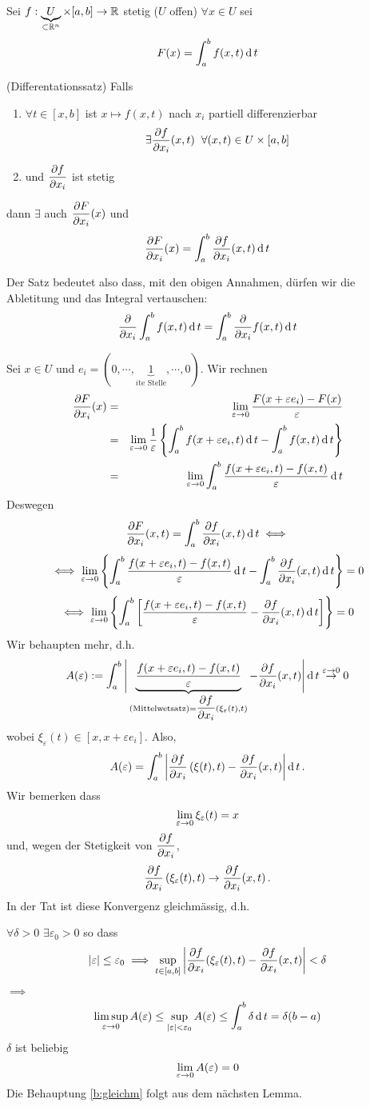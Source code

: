Sei $f:\underbrace{U}_{\subset \mathbb{R}^n}\times [a,b]\rightarrow\mathbb{R}$ stetig ($U$ offen) $\forall x\in U$ sei
\[F(x)=\int_a^bf(x,t)\operatorname{d} t\]
\begin{Sat}
  (Differentationssatz) Falls
  \begin{enumerate}
    \item $\forall t\in \left[ x,b \right]$ ist $x\mapsto f(x,t)$ nach $x_i$ partiell differenzierbar
      \[\exists\dfrac{\partial f}{\partial x_i}(x,t)\hspace{2mm}\forall (x,t)\in U\times \left[ a,b \right]\]
    \item und $\dfrac{\partial f}{\partial x_i}$ ist stetig
  \end{enumerate}
  dann $\exists$ auch $\dfrac{\partial F}{\partial x_i}(x)$ und
  \[\dfrac{\partial F}{\partial x_i}(x)=\int_a^b\dfrac{\partial f}{\partial x_i}(x,t)\operatorname{d} t\]
\end{Sat}
Der Satz bedeutet also dass, mit den obigen Annahmen, d\"urfen wir die
Abletitung und das Integral vertauschen:
\[
\dfrac{\partial }{\partial x_i}\int_a^bf(x,t)\operatorname{d} t=\int_a^b\dfrac{\partial }{\partial x_i}f(x,t)\operatorname{d} t
\]
\begin{Bew}
  Sei $x\in U$ und $e_i=(0,\cdots,\underbrace{1}_{i\text{te Stelle}},\cdots,0)$. Wir rechnen
  \begin{eqnarray*}
\dfrac{\partial F}{\partial x_i} (x)&=&\displaystyle\lim_{\varepsilon\rightarrow0}\frac{F(x+\varepsilon e_i)-F(x)}{\varepsilon}\\
&=&\displaystyle\lim_{\varepsilon\rightarrow0}\frac{1}{\varepsilon}\left\{ \int_a^bf(x+\varepsilon e_i ,t)\operatorname{d} t-\int_a^bf(x,t)\operatorname{d} t \right\}\\
  &=&\displaystyle\lim_{\varepsilon\rightarrow0}\int_a^b\frac{f(x+\varepsilon e_i,t)-f(x,t)}{\varepsilon}\operatorname{d} t
\end{eqnarray*}
Deswegen
  \[\dfrac{\partial F}{\partial x_i}(x,t)=\int_a^b\dfrac{\partial f}{\partial x_i}(x,t)\operatorname{d} t\iff\]
  \[\iff \displaystyle\lim_{\varepsilon\rightarrow0}\left\{ \int_a^b\frac{f(x+\varepsilon e_i,t)-f(x,t)}{\varepsilon}\operatorname{d} t-\int_a^b\dfrac{\partial f}{\partial x_i}(x,t)\operatorname{d} t \right\}=0\]
  \[\iff \displaystyle\lim_{\varepsilon\rightarrow0}\left\{ \int_a^b\left[ \frac{f(x+\varepsilon e_i,t)-f(x,t)}{\varepsilon}-\dfrac{\partial f}{\partial x_i}(x,t)\operatorname{d} t \right] \right\}=0\]
  Wir behaupten mehr, d.h.
  \[A (\varepsilon) := \int_a^b\Bigg|\underbrace{\frac{f(x+\varepsilon e_i,t)-f(x,t)}{\varepsilon}}_{\text{(Mittelwetsatz)} = \dfrac{\partial f}{\partial x_i}(\xi_\varepsilon (t),t)}-\dfrac{\partial f}{\partial x_i}(x,t)\Bigg|\operatorname{d} t\stackrel{\varepsilon\rightarrow 0}{\rightarrow}0\]
  wobei $\xi_\varepsilon(t)\in \left[ x,x+\varepsilon e_i \right]$. Also,
  \[ A(\varepsilon)=\int_a^b\left| \dfrac{\partial f}{\partial x_i}\left( \xi(t),t \right)-\dfrac{\partial f}{\partial x_i}(x,t) \right|\operatorname{d} t\, .\]
Wir bemerken dass
  \[\displaystyle\lim_{\varepsilon\rightarrow0}\xi_\varepsilon(t)=x\]
  und, wegen der Stetigkeit von $\dfrac{\partial f}{\partial x_i}$,
  \[\dfrac{\partial f}{\partial x_i}\left( \xi_\varepsilon(t),t \right)\rightarrow \dfrac{\partial f}{\partial x_i}(x,t)\, .\]
In der Tat ist diese Konvergenz gleichm\"assig, d.h.
  \begin{Beh}\label{b:gleichm}
    $\forall \delta>0$ $\exists \varepsilon_0>0$ so dass
    \[\left| \varepsilon \right|\leq \varepsilon_0\implies \sup_{t\in [a,b]}\left| \dfrac{\partial f}{\partial x_i}(\xi_\varepsilon (t),t)-\dfrac{\partial f}{\partial x_i}(x,t) \right|<\delta\]
  \end{Beh}
  $\implies$
  \[\limsup_{\varepsilon\rightarrow 0} A(\varepsilon)\leq \sup_{\left| \varepsilon \right|<\varepsilon_0}A(\varepsilon)
  \leq \int_a^b\delta\operatorname{d} t=\delta(b-a)\]
  $\delta$ ist beliebig
  \[\displaystyle\lim_{\varepsilon\rightarrow0}A(\varepsilon)=0\]
Die Behauptung \ref{b:gleichm} folgt aus dem n\"achsten Lemma.
\end{Bew}

